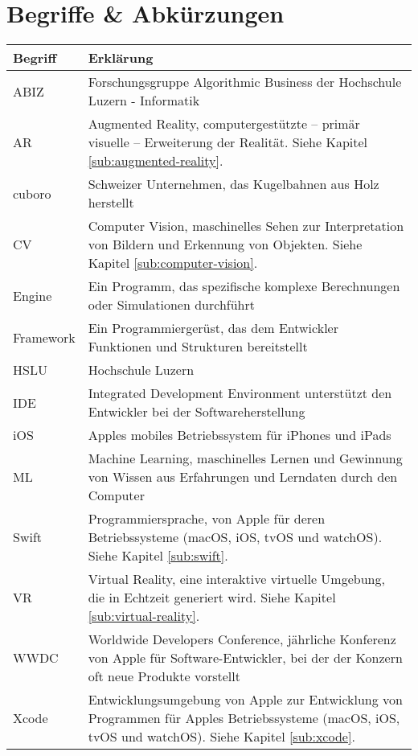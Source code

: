 \section*{Begriffe \& Abkürzungen}
\begin{table}
	\begin{tabular}{@{} p{} p{} @{}}
		\hline
		\textbf{Begriff} & \textbf{Erklärung} \\
		\hline
		ABIZ	& Forschungsgruppe Algorithmic Business der Hochschule Luzern - Informatik \\
		AR 		& Augmented Reality, computergestützte – primär visuelle – Erweiterung der Realität. Siehe Kapitel \ref{sub:augmented-reality}. \\
		cuboro	& Schweizer Unternehmen, das Kugelbahnen aus Holz herstellt \\
		CV		& Computer Vision, maschinelles Sehen zur Interpretation von Bildern und Erkennung von Objekten. Siehe Kapitel \ref{sub:computer-vision}. \\
		Engine	& Ein Programm, das spezifische komplexe Berechnungen oder Simulationen durchführt \\
		Framework	& Ein Programmiergerüst, das dem Entwickler Funktionen und Strukturen bereitstellt \\
		HSLU	& Hochschule Luzern \\
		IDE 	& Integrated Development Environment unterstützt den Entwickler bei der Softwareherstellung \\
		iOS		& Apples mobiles Betriebssystem für iPhones und iPads \\
		ML		& Machine Learning, maschinelles Lernen und Gewinnung von Wissen aus Erfahrungen und Lerndaten durch den Computer \\
		Swift	& Programmiersprache, von Apple für deren Betriebssysteme (macOS, iOS, tvOS und watchOS). Siehe Kapitel \ref{sub:swift}. \\
		VR		& Virtual Reality, eine interaktive virtuelle Umgebung, die in Echtzeit generiert wird. Siehe Kapitel \ref{sub:virtual-reality}. \\
		WWDC	& Worldwide Developers Conference, jährliche Konferenz von Apple für Software-Entwickler, bei der der Konzern oft neue Produkte vorstellt \\
		Xcode	& Entwicklungsumgebung von Apple zur Entwicklung von Programmen für Apples Betriebssysteme (macOS, iOS, tvOS und watchOS). Siehe Kapitel \ref{sub:xcode}. \\
		\hline
	\end{tabular}
\end{table}

